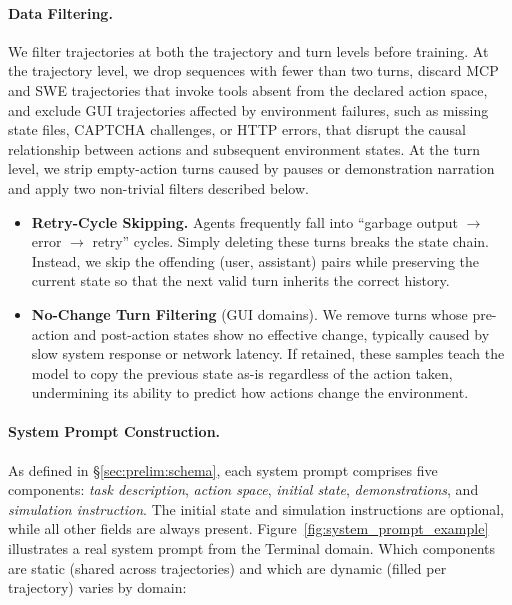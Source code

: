 \paragraph{Data Filtering.}
We filter trajectories at both the trajectory and turn levels before training.
At the trajectory level, we drop sequences with fewer than two turns, discard MCP and SWE trajectories that invoke tools absent from the declared action space, and exclude GUI trajectories affected by environment failures, such as missing state files, CAPTCHA challenges, or HTTP errors, that disrupt the causal relationship between actions and subsequent environment states.
At the turn level, we strip empty-action turns caused by pauses or demonstration narration and apply two non-trivial filters described below.

\begin{itemize}[leftmargin=1.5em,itemsep=2pt]
    \item \textbf{Retry-Cycle Skipping.}
    Agents frequently fall into ``garbage output $\to$ error $\to$ retry'' cycles.
    Simply deleting these turns breaks the state chain. Instead, we skip the offending (user, assistant) pairs while preserving the current state so that the next valid turn inherits the correct history.

    \item \textbf{No-Change Turn Filtering} (GUI domains).
    We remove turns whose pre-action and post-action states show no effective change, typically caused by slow system response or network latency.
    If retained, these samples teach the model to copy the previous state as-is regardless of the action taken, undermining its ability to predict how actions change the environment.
\end{itemize}


\paragraph{System Prompt Construction.}
\label{sec:pipeline:prompt}
As defined in \S\ref{sec:prelim:schema}, each system prompt comprises five components: \emph{task description}, \emph{action space}, \emph{initial state}, \emph{demonstrations}, and \emph{simulation instruction}.
The initial state and simulation instructions are optional, while all other fields are always present.
Figure~\ref{fig:system_prompt_example} illustrates a real system prompt from the Terminal domain.
Which components are static (shared across trajectories) and which are dynamic (filled per trajectory) varies by domain:

